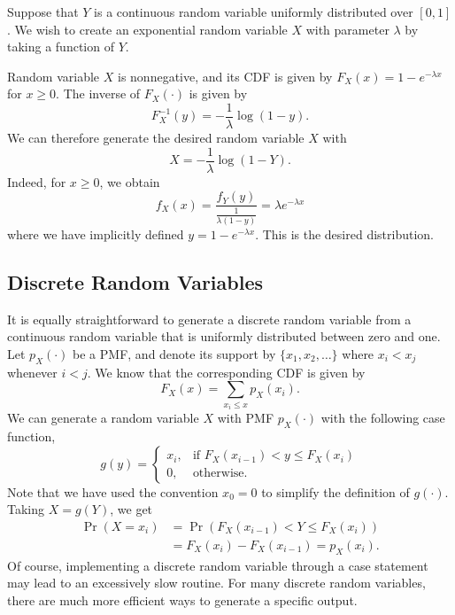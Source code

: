 \begin{example}
Suppose that $Y$ is a continuous random variable uniformly distributed over $[0,1]$.
We wish to create an exponential random variable $X$ with parameter $\lambda$ by taking a function of $Y$.

Random variable $X$ is nonnegative, and its CDF is given by $F_X(x) = 1 - e^{- \lambda x}$ for $x \geq 0$.
The inverse of $F_X (\cdot)$ is given by
\begin{equation*}
F_X^{-1} (y) = - \frac{1}{\lambda} \log (1 - y) .
\end{equation*}
We can therefore generate the desired random variable $X$ with
\begin{equation*}
X = - \frac{1}{\lambda} \log (1 - Y) .
\end{equation*}
Indeed, for $x \geq 0$, we obtain
\begin{equation*}
f_X (x) = \frac{ f_Y (y) }{ \frac{1}{\lambda (1 - y)} }
= \lambda e^{- \lambda x}
\end{equation*}
where we have implicitly defined $y = 1 - e^{- \lambda x}$.
This is the desired distribution.
\end{example}


\subsection{Discrete Random Variables}

It is equally straightforward to generate a discrete random variable from a continuous random variable that is uniformly distributed between zero and one.
Let $p_X(\cdot)$ be a PMF, and denote its support by $\{ x_1, x_2, \ldots \}$ where $x_i < x_j$ whenever $i < j$.
We know that the corresponding CDF is given by
\begin{equation*}
F_X(x) = \sum_{x_i \leq x} p_X (x_i) .
\end{equation*}
We can generate a random variable $X$ with PMF $p_X(\cdot)$ with the following case function,
\begin{equation*}
g(y) = \begin{cases} x_i, & \text{if } F_X(x_{i-1}) < y \leq F_X (x_i) \\
0, & \text{otherwise}. \end{cases}
\end{equation*}
Note that we have used the convention $x_0 = 0$ to simplify the definition of $g(\cdot)$.
Taking $X = g(Y)$, we get
\begin{equation*}
\begin{split}
\Pr (X = x_i) &= \Pr ( F_X(x_{i-1}) < Y \leq F_X (x_i) ) \\
&= F_X (x_i) - F_X (x_{i-1}) = p_X (x_i) .
\end{split}
\end{equation*}
Of course, implementing a discrete random variable through a case statement may lead to an excessively slow routine.
For many discrete random variables, there are much more efficient ways to generate a specific output.


